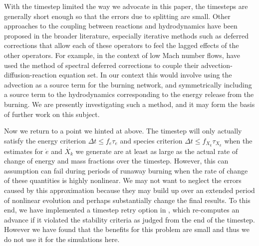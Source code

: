 \documentclass[12pt]{article}
\begin{document}
With the timestep limited the way we advocate in this paper, 
the timesteps are generally short enough so that the errors 
due to splitting are small. Other approaches to the coupling 
between reactions and hydrodynamics have been proposed in the 
broader literature, especially iterative methods such as 
deferred corrections that allow each of these operators to 
feel the lagged effects of the other operators. For example,
in the context of low Mach number flows, \cite{nonaka:2012} have
used the method of spectral deferred corrections \citep{SDC} to
couple their advection-diffusion-reaction equation set. In our
context this would involve using the advection as a source term
for the burning network, and symmetrically including a source
term to the hydrodynamics corresponding to the energy release
from the burning. We are presently investigating such a method,
and it may form the basis of further work on this subject.

Now we return to a point we hinted at above. The timestep
will only actually satisfy the energy criterion
$\Delta t \leq f_e \tau_e$ and species criterion
$\Delta t \leq f_{X_k} \tau_{X_k}$ when the estimates for
$\dot{e}$ and $\dot{X_k}$ we generate are at least as large
as the actual rate of change of energy and mass fractions
over the timestep. However, this can assumption can fail
during periods of runaway burning when the rate of change
of these quantities is highly nonlinear. We may not want
to neglect the errors caused by this approximation
because they may build up over an extended period of nonlinear
evolution and perhaps substantially change the final results.
To this end, we have implemented a timestep retry option in
\castro, which re-computes an advance if it violated the
stability criteria as judged from the end of the timestep.
However we have found that the benefits for this problem are
small and thus we do not use it for the simulations here.
\end{document}
